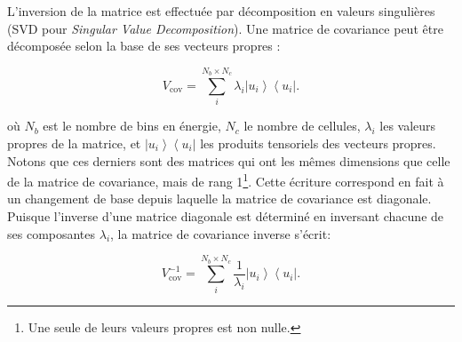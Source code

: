 
%
%

L'inversion de la matrice est effectuée par décomposition en valeurs singulières (SVD pour \textit{Singular Value Decomposition}). Une matrice de covariance peut être décomposée selon la base de ses vecteurs propres :

\begin{equation}
    V_\textrm{cov} = \sum_i^{N_{b} \times N_{c}} \lambda_i \left| u_i \right> \left< u_i \right|.
\end{equation}

\bigbreak

où $N_{b}$ est le nombre de bins en énergie, $N_{c}$ le nombre de cellules, $\lambda_i$ les valeurs propres de la matrice, et $\left| u_i \right>\left< u_i \right|$ les produits tensoriels des vecteurs propres. Notons que ces derniers sont des matrices qui ont les mêmes dimensions que celle de la matrice de covariance, mais de rang 1\footnote{Une seule de leurs valeurs propres est non nulle.}. Cette écriture  correspond en fait à un changement de base depuis laquelle la matrice de covariance est diagonale. Puisque l'inverse d'une matrice diagonale est déterminé en inversant chacune de ses composantes $\lambda_i$, la matrice de covariance inverse s'écrit:

\begin{equation}
    V_\textrm{cov}^{-1} = \sum_i^{N_{b} \times N_{c}} \frac{1}{\lambda_i} \left| u_i \right> \left< u_i \right|.
\end{equation}

